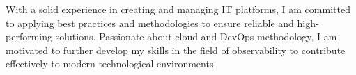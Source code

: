

\begin{cvparagraph}

With a solid experience in creating and managing IT platforms, I am committed to applying best practices and methodologies to ensure reliable and high-performing solutions. Passionate about cloud and DevOps methodology, I am motivated to further develop my skills in the field of observability to contribute effectively to modern technological environments.
\end{cvparagraph}
